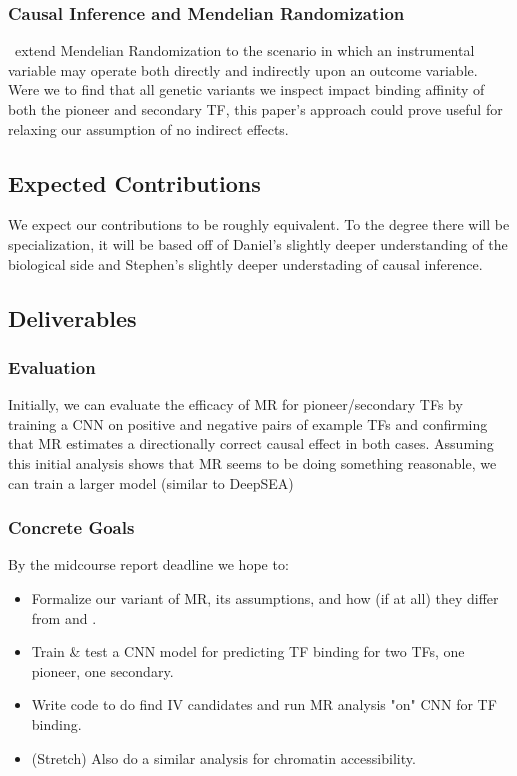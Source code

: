 \subsubsection{Causal Inference and Mendelian Randomization}
\cite{burgess2014network}~extend Mendelian Randomization to the scenario in which an instrumental variable may operate both directly and indirectly upon an outcome variable. Were we to find that all genetic variants we inspect impact binding affinity of both the pioneer and secondary TF, this paper's approach could prove useful for relaxing our assumption of no indirect effects.

\subsection{Expected Contributions}
We expect our contributions to be roughly equivalent. To the degree there will be specialization, it will be based off of Daniel's  slightly deeper understanding of the biological side and Stephen's slightly deeper understading of causal inference.

\subsection{Deliverables}
\subsubsection{Evaluation}
Initially, we can evaluate the efficacy of MR for pioneer/secondary TFs by training a CNN on positive and negative pairs of example TFs and confirming that MR estimates a directionally correct causal effect in both cases. Assuming this initial analysis shows that MR seems to be doing something reasonable, we can train a larger model (similar to DeepSEA) 

\subsubsection{Concrete Goals}
By the midcourse report deadline we hope to: 
\begin{itemize}
    \item Formalize our variant of MR, its assumptions, and how (if at all) they differ from \cite{zhao2018statistical} and \cite{burgess2014network}.
    \item Train \& test a CNN model for predicting TF binding for two TFs, one pioneer, one secondary.
    \item Write code to do find IV candidates and run MR analysis "on" CNN for TF binding. 
    \item (Stretch) Also do a similar analysis for chromatin accessibility.
\end{itemize}

